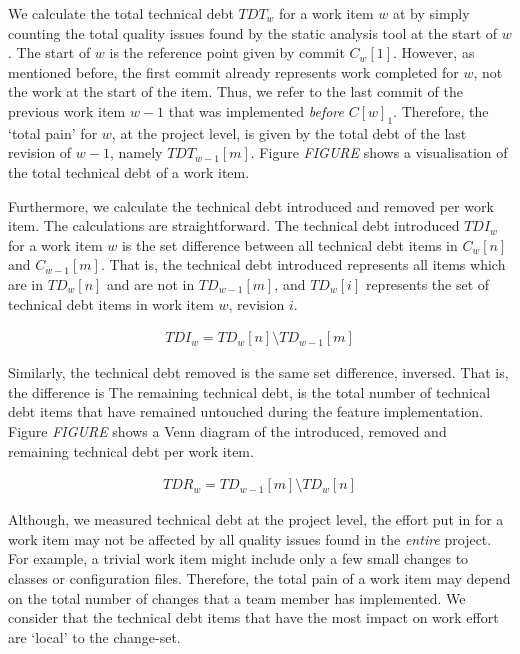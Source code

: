 \documentclass{mpaper}
\begin{document}
We calculate the total technical debt $TDT_{w}$ for a work item $w$ at by simply
counting the total quality issues found by the static analysis tool at the start
of $w$. The start of $w$ is the reference point given by commit $C_{w}[1]$.
However, as mentioned before, the first commit already represents work completed
for $w$, not the work at the start of the item. Thus, we refer to the last
commit of the previous work item $w-1$ that was implemented \emph{before}
$C[w]_{1}$. Therefore, the `total pain' for $w$, at the project level, is given
by the total debt of the last revision of $w-1$, namely $TDT_{w-1}[m]$. Figure
\emph{FIGURE} shows a visualisation of the total technical debt of a work item.

Furthermore, we calculate the technical debt introduced and removed per work
item. The calculations are straightforward. The technical debt introduced
$TDI_{w}$ for a work item $w$ is the set difference between all technical debt
items in $C_{w}[n]$ and $C_{w-1}[m]$. That is, the technical debt introduced
represents all items which are in $TD_{w}[n]$ and are not in $TD_{w-1}[m]$, and
$TD_{w}[i]$ represents the set of technical debt items in work item $w$,
revision $i$.

\begin{equation}
  \label{eq-td-introduced}
  \begin{aligned}
    TDI_{w} = TD_{w}[n]  \setminus TD_{w-1}[m]
  \end{aligned}
\end{equation}

Similarly, the technical debt removed is the same set difference, inversed. That
is, the difference is  The remaining technical debt, is the total number of
technical debt items that have remained untouched during the feature
implementation. Figure \emph{FIGURE} shows a Venn diagram of the introduced,
removed and remaining technical debt per work item. 

\begin{equation}
	\label{eq-td-introduced}
	\begin{aligned}
		TDR_{w} = TD_{w-1}[m]  \setminus TD_{w}[n]
	\end{aligned}
\end{equation}

Although, we measured technical debt at the project level, the effort put in for
a work item may not be affected by all quality issues found in the \emph{entire}
project. For example, a trivial work item might include only a few small changes
to classes or configuration files. Therefore, the total pain of a work item may
depend on the total number of changes that a team member has implemented. We
consider that the technical debt items that have the most impact on work effort
are `local' to the change-set.
\end{document}

